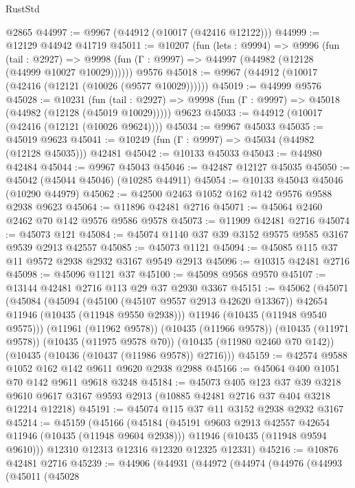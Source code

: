 \begin{lexlean}{RustStd}
\begin{coremodule}
    @2865
@44997 := @9967 (@44912 (@10017 (@42416 @12122)))
@44999 := @12129 @44942 @41719
@45011 := @10207
    (fun (lets : @9994) =>
    @9996
      (fun (tail : @2927) =>
      @9998 (fun (Γ : @9997) => @44997 (@44982 (@12128 (@44999 @10027 @10029))))))
    @9576
@45018 := @9967 (@44912 (@10017 (@42416 (@12121 (@10026 (@9577 @10029))))))
@45019 := @44999 @9576
@45028 := @10231
    (fun (tail : @2927) => @9998 (fun (Γ : @9997) => @45018 (@44982 (@12128 (@45019 @10029)))))
    @9623
@45033 := @44912 (@10017 (@42416 (@12121 (@10026 @9624))))
@45034 := @9967 @45033
@45035 := @45019 @9623
@45041 := @10249 (fun (Γ : @9997) => @45034 (@44982 (@12128 @45035))) @42481
@45042 := @10133 @45033
@45043 := @44980 @42484
@45044 := @9967 @45043
@45046 := @42487 @12127 @45035
@45050 := @45042 (@45044 @45046) (@10285 @44911)
@45054 := @10133 @45043 @45046 (@10290 @44979)
@45062 := @42500 @2463 @1052 @162 @142 @9576 @9588 @2938 @9623
@45064 := @11896 @42481 @2716
@45071 := @45064 @2460 @2462 @70 @142 @9576 @9586 @9578
@45073 := @11909 @42481 @2716
@45074 := @45073 @121
@45084 := @45074 @1140 @37 @39 @3152 @9575 @9585 @3167 @9539 @2913 @42557
@45085 := @45073 @1121
@45094 := @45085 @115 @37 @11 @9572 @2938 @2932 @3167 @9549 @2913
@45096 := @10315 @42481 @2716
@45098 := @45096 @1121 @37
@45100 := @45098 @9568 @9570
@45107 := @13144 @42481 @2716 @113 @29 @37 @2930 @3367
@45151 := @45062
    (@45071
      (@45084
        (@45094
          (@45100 (@45107 @9557 @2913 @42620 @13367))
          @42654
          @11946
          (@10435 (@11948 @9550 @2938)))
        @11946
        (@10435 (@11948 @9540 @9575)))
      (@11961 (@11962 @9578))
      (@10435 (@11966 @9578))
      (@10435 (@11971 @9578))
      (@10435 (@11975 @9578 @70))
      (@10435 (@11980 @2460 @70 @142))
      (@10435 (@10436 (@10437 (@11986 @9578)) @2716)))
@45159 := @42574 @9588 @1052 @162 @142 @9611 @9620 @2938 @2988
@45166 := @45064 @400 @1051 @70 @142 @9611 @9618 @3248
@45184 := @45073
    @405
    @123
    @37
    @39
    @3218
    @9610
    @9617
    @3167
    @9593
    @2913
    (@10885 @42481 @2716 @37 @404 @3218 @12214 @12218)
@45191 := @45074 @115 @37 @11 @3152 @2938 @2932 @3167
@45214 := @45159
    (@45166
      (@45184
        (@45191 @9603 @2913 @42557 @42654 @11946 (@10435 (@11948 @9604 @2938)))
        @11946
        (@10435 (@11948 @9594 @9610)))
      @12310
      @12313
      @12316
      @12320
      @12325
      @12331)
@45216 := @10876 @42481 @2716
@45239 := @44906
    (@44931
      (@44972
        (@44974
          (@44976
            (@44993
              (@45011
                (@45028

\end{coremodule}
\end{lexlean}
